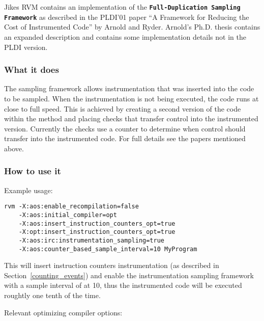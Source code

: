 Jikes RVM contains an implementation of the {\bf \tt Full-Duplication
Sampling Framework} as described in the PLDI'01 paper ``A Framework
for Reducing the Cost of Instrumented Code'' by Arnold and Ryder.
Arnold's Ph.D. thesis contains an expanded description and contains
some implementation details not in the PLDI version.


\subsubsection{What it does}

The sampling framework allows instrumentation that was inserted into
the code to be sampled.  When the instrumentation is not being
executed, the code runs at close to full speed.  This is achieved by
creating a second version of the code within the method and placing
checks that transfer control into the instrumented version.  Currently
the checks use a counter to determine when control should transfer
into the instrumented code.
For full details see the papers mentioned above. 

\subsubsection{How to use it}

Example usage: 
\begin{verbatim}
rvm -X:aos:enable_recompilation=false
    -X:aos:initial_compiler=opt
    -X:aos:insert_instruction_counters_opt=true
    -X:opt:insert_instruction_counters_opt=true
    -X:aos:irc:instrumentation_sampling=true
    -X:aos:counter_based_sample_interval=10 MyProgram
\end{verbatim}

This will insert instruction counters instrumentation (as described in
Section~\ref{counting_events}) and enable the instrumentation sampling
framework with a sample interval of at 10, thus the instrumented code
will be executed roughtly one tenth of the time.   

Relevant optimizing compiler options:


